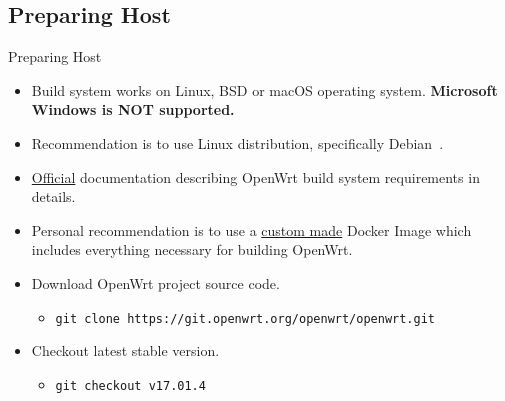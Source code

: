 \subsection{Preparing Host}
\begin{frame}{Preparing Host}
    \pause
    \begin{itemize}[<+-|alert@+>]
        \item Build system works on Linux, BSD or macOS operating system. \textbf{Microsoft Windows is NOT supported.}
        \item Recommendation is to use Linux distribution, specifically Debian~\cite{debian-website}.
        \item \href{https://openwrt.org/docs/guide-developer/build-system/install-buildsystem}{Official} documentation describing OpenWrt build system requirements in details.
        \item Personal recommendation is to use a \href{https://github.com/hvarga/openwrt-application-development/blob/master/presentation/resources/Dockerfile}{custom made} Docker Image which includes everything necessary for building OpenWrt.
        \item Download OpenWrt project source code.
        \begin{itemize}
            \item \texttt{git clone https://git.openwrt.org/openwrt/openwrt.git}
        \end{itemize}
        \item Checkout latest stable version.
        \begin{itemize}
            \item \texttt{git checkout v17.01.4}
        \end{itemize}
    \end{itemize}
\end{frame}

